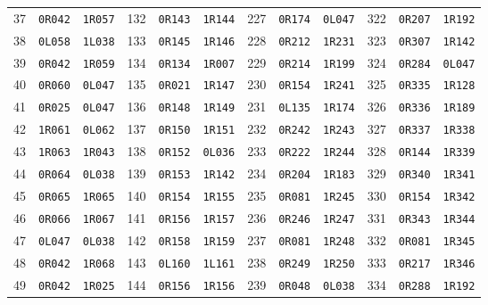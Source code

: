 \documentclass[11pt,letterpaper]{article}
\begin{document}
\begin{longtable}{@{}rll@{\qquad}rll@{\qquad}rll@{\qquad}rll@{}}
37 & \texttt{0R042} & \texttt{1R057} & 132 & \texttt{0R143} & \texttt{1R144} & 227 & \texttt{0R174} & \texttt{0L047} & 322 & \texttt{0R207} & \texttt{1R192} \\
38 & \texttt{0L058} & \texttt{1L038} & 133 & \texttt{0R145} & \texttt{1R146} & 228 & \texttt{0R212} & \texttt{1R231} & 323 & \texttt{0R307} & \texttt{1R142} \\
39 & \texttt{0R042} & \texttt{1R059} & 134 & \texttt{0R134} & \texttt{1R007} & 229 & \texttt{0R214} & \texttt{1R199} & 324 & \texttt{0R284} & \texttt{0L047} \\
40 & \texttt{0R060} & \texttt{0L047} & 135 & \texttt{0R021} & \texttt{1R147} & 230 & \texttt{0R154} & \texttt{1R241} & 325 & \texttt{0R335} & \texttt{1R128} \\
41 & \texttt{0R025} & \texttt{0L047} & 136 & \texttt{0R148} & \texttt{1R149} & 231 & \texttt{0L135} & \texttt{1R174} & 326 & \texttt{0R336} & \texttt{1R189} \\
42 & \texttt{1R061} & \texttt{0L062} & 137 & \texttt{0R150} & \texttt{1R151} & 232 & \texttt{0R242} & \texttt{1R243} & 327 & \texttt{0R337} & \texttt{1R338} \\
43 & \texttt{1R063} & \texttt{1R043} & 138 & \texttt{0R152} & \texttt{0L036} & 233 & \texttt{0R222} & \texttt{1R244} & 328 & \texttt{0R144} & \texttt{1R339} \\
44 & \texttt{0R064} & \texttt{0L038} & 139 & \texttt{0R153} & \texttt{1R142} & 234 & \texttt{0R204} & \texttt{1R183} & 329 & \texttt{0R340} & \texttt{1R341} \\
45 & \texttt{0R065} & \texttt{1R065} & 140 & \texttt{0R154} & \texttt{1R155} & 235 & \texttt{0R081} & \texttt{1R245} & 330 & \texttt{0R154} & \texttt{1R342} \\
46 & \texttt{0R066} & \texttt{1R067} & 141 & \texttt{0R156} & \texttt{1R157} & 236 & \texttt{0R246} & \texttt{1R247} & 331 & \texttt{0R343} & \texttt{1R344} \\
47 & \texttt{0L047} & \texttt{0L038} & 142 & \texttt{0R158} & \texttt{1R159} & 237 & \texttt{0R081} & \texttt{1R248} & 332 & \texttt{0R081} & \texttt{1R345} \\
48 & \texttt{0R042} & \texttt{1R068} & 143 & \texttt{0L160} & \texttt{1L161} & 238 & \texttt{0R249} & \texttt{1R250} & 333 & \texttt{0R217} & \texttt{1R346} \\
49 & \texttt{0R042} & \texttt{1R025} & 144 & \texttt{0R156} & \texttt{1R156} & 239 & \texttt{0R048} & \texttt{0L038} & 334 & \texttt{0R288} & \texttt{1R192} \\

\end{longtable}
\end{document}
